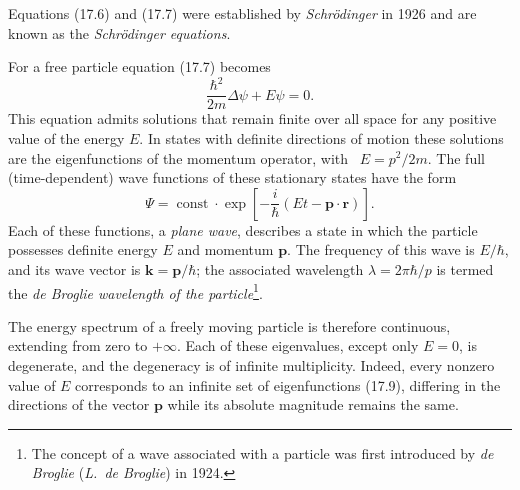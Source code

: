 Equations (17.6) and (17.7) were established by \emph{Schrödinger} in 1926 and
are known as the \emph{Schrödinger equations}.

For a free particle equation (17.7) becomes
\begin{equation}
  \frac{\hbar^2}{2m}\Delta\psi+E\psi=0.
  \tag{17.8}
\end{equation}
This equation admits solutions that remain finite over all space for any positive value
of the energy $E$. In states with definite directions of motion these
solutions are the eigenfunctions of the momentum operator, with%
\relax\ $E=p^2/2m$. The full (time-dependent) wave functions of these
stationary states have the form
\begin{equation}
  \Psi=\operatorname{const}\cdot
  \exp\left[-\frac{i}{\hbar}(Et-\mathbf p\cdot\mathbf r)\right].
  \tag{17.9}
\end{equation}
Each of these functions, a \emph{plane wave}, describes a state in which the
particle possesses definite energy $E$ and momentum $\mathbf p$. The frequency of
this wave is $E/\hbar$, and its wave vector is
$\mathbf k=\mathbf p/\hbar$; the associated wavelength
$\lambda=2\pi\hbar/p$ is termed the \emph{de Broglie wavelength of the
particle}\footnote{The concept of a wave associated with a particle was first
introduced by \emph{de Broglie} (\emph{L.~de Broglie}) in 1924.}.

The energy spectrum of a freely moving particle is therefore continuous,
extending from zero to $+\infty$. Each of these eigenvalues, except only
$E=0$, is degenerate, and the degeneracy is of infinite multiplicity. Indeed,
every nonzero value of $E$ corresponds to an infinite set of eigenfunctions
(17.9), differing in the directions of the vector $\mathbf p$ while its
absolute magnitude remains the same.

